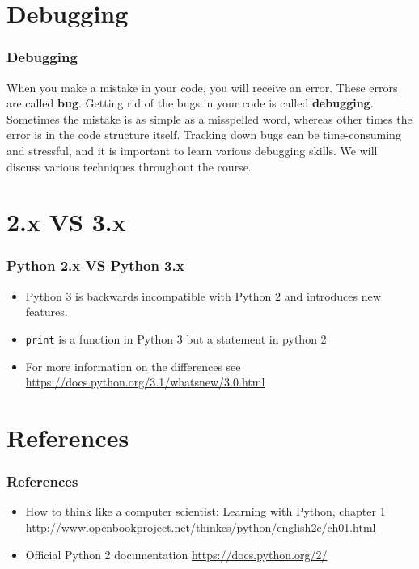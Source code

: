 \documentclass{beamer}
\newcommand{\<}{\langle}
\renewcommand{\>}{\rangle}
\begin{document}
\section{Debugging}

\begin{frame}
\frametitle{Debugging}

When you make a mistake in your code, you will receive an error. These errors are called \textbf{bug}. Getting rid of the bugs in your code is called \textbf{debugging}. Sometimes the mistake is as simple as a misspelled word, whereas other times the error is in the code structure itself. Tracking down bugs can be time-consuming and stressful, and it is important to learn various debugging skills. We will discuss various techniques throughout the course.
\end{frame}

\section{2.x VS 3.x}

\begin{frame}[fragile]
\frametitle{Python 2.x VS Python 3.x}

\begin{itemize}
\item Python $3$ is backwards incompatible with Python $2$ and introduces new features.
\item \verb|print| is a function in Python 3 but a statement in python 2
\item For more information on the differences see \url{https://docs.python.org/3.1/whatsnew/3.0.html}
\end{itemize}
\end{frame}

\section{References}

\begin{frame}
\frametitle{References}

\begin{itemize}
\item
How to think like a computer scientist: Learning with Python, chapter 1
\url{http://www.openbookproject.net/thinkcs/python/english2e/ch01.html}

\item
Official Python  2 documentation
\url{https://docs.python.org/2/}
\end{itemize}
\end{frame}
\end{document}
